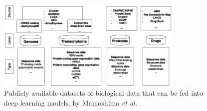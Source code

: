 \documentclass[journal]{IEEEtran}
\begin{document}
\begin{figure}[!t]
\centering
\includegraphics[width=3.5in]{datasources.png}
\caption{Publicly available datasets of biological data that can be fed into deep learning models, by Mamoshima \textit{et al.}~\cite{Mamoshina2016}}
\label{fig_sim}
\end{figure}


%
%



%
%
\end{document}
